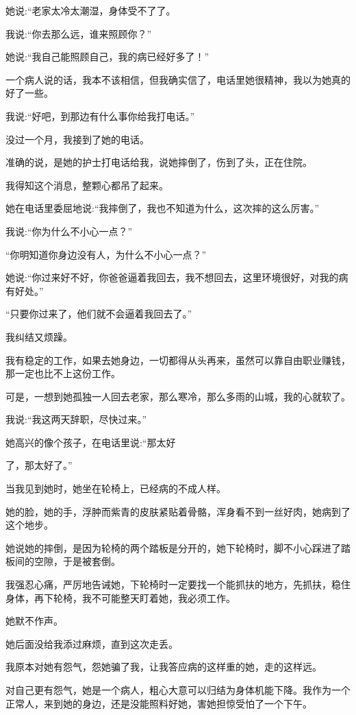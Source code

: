 \documentclass{article}
\begin{document}
她说:“老家太冷太潮湿，身体受不了了。

我说:“你去那么远，谁来照顾你？”

她说:“我自己能照顾自己，我的病已经好多了！”

一个病人说的话，我本不该相信，但我确实信了，电话里她很精神，我以为她真的好了一些。

我说:“好吧，到那边有什么事你给我打电话。”

\newpage 



没过一个月，我接到了她的电话。

准确的说，是她的护士打电话给我，说她摔倒了，伤到了头，正在住院。

我得知这个消息，整颗心都吊了起来。

她在电话里委屈地说:“我摔倒了，我也不知道为什么，这次摔的这么厉害。”

我说:“你为什么不小心一点？”

“你明知道你身边没有人，为什么不小心一点？”

她说:“你过来好不好，你爸爸逼着我回去，我不想回去，这里环境很好，对我的病有好处。”

“只要你过来了，他们就不会逼着我回去了。”

我纠结又烦躁。

我有稳定的工作，如果去她身边，一切都得从头再来，虽然可以靠自由职业赚钱，那一定也比不上这份工作。

可是，一想到她孤独一人回去老家，那么寒冷，那么多雨的山城，我的心就软了。

我说:“我这两天辞职，尽快过来。”

她高兴的像个孩子，在电话里说:“那太好

\newpage 

了，那太好了。”

当我见到她时，她坐在轮椅上，已经病的不成人样。

她的脸，她的手，浮肿而紫青的皮肤紧贴着骨骼，浑身看不到一丝好肉，她病到了这个地步。

她说她的摔倒，是因为轮椅的两个踏板是分开的，她下轮椅时，脚不小心踩进了踏板间的空隙，于是被套倒。

我强忍心痛，严厉地告诫她，下轮椅时一定要找一个能抓扶的地方，先抓扶，稳住身体，再下轮椅，我不可能整天盯着她，我必须工作。

她默不作声。

她后面没给我添过麻烦，直到这次走丢。

我原本对她有怨气，怨她骗了我，让我答应病的这样重的她，走的这样远。

对自己更有怨气，她是一个病人，粗心大意可以归结为身体机能下降。我作为一个正常人，来到她的身边，还是没能照料好她，害她担惊受怕了一个下午。
\end{document}
